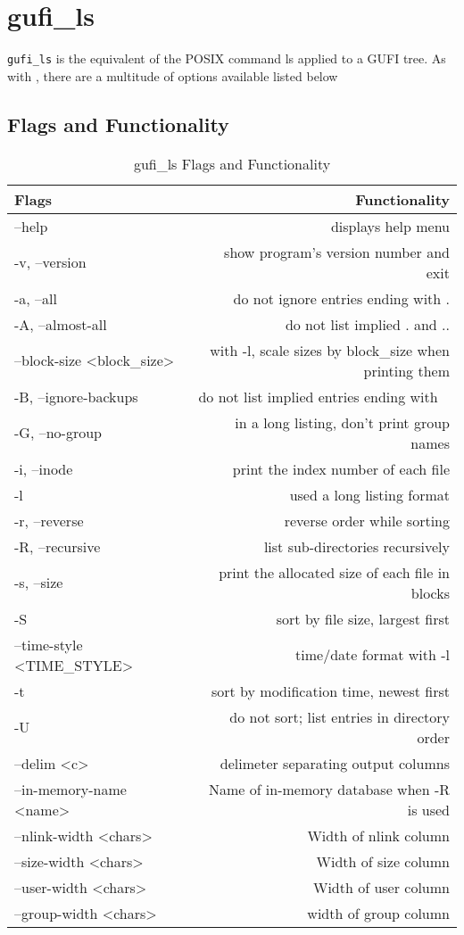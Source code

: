 \section{gufi\_ls}
\texttt{gufi\_ls} is the equivalent of the POSIX command ls applied to
a GUFI tree. As with \gufifind, there are a multitude of options
available listed below

\subsection{Flags and Functionality}
\begin{table} [h]
  \centering
  \begin{tabular}{l|r}
    Flags & Functionality\\\hline
    --help & displays help menu\\
    -v, --version & show program's version number and exit \\
    -a, --all & do not ignore entries ending with .\\
    -A, --almost-all & do not list implied . and .. \\
    --block-size \textless block\_size\textgreater & with -l, scale sizes by block\_size when printing them \\
    -B, --ignore-backups & do not list implied entries ending with ~\\
    -G, --no-group & in a long listing, don't print group names\\
    -i, --inode & print the index number of each file\\
    -l & used a long listing format\\
    -r, --reverse & reverse order while sorting\\
    -R, --recursive & list sub-directories recursively\\
    -s, --size & print the allocated size of each file in blocks\\
    -S & sort by file size, largest first \\
    --time-style \textless TIME\_STYLE\textgreater & time/date format with -l\\
    -t & sort by modification time, newest first\\
    -U & do not sort; list entries in directory order\\
    --delim \textless c\textgreater & delimeter separating output columns\\
    --in-memory-name \textless name\textgreater & Name of in-memory database when -R is used\\
    --nlink-width \textless chars\textgreater & Width of nlink column\\
    --size-width \textless chars\textgreater & Width of size column\\
    --user-width \textless chars\textgreater & Width of user column\\
    --group-width \textless chars\textgreater & width of group column
  \end{tabular}
  \caption{\label{fig:gufi_ls flags}{gufi\_ls Flags and Functionality}}
\end{table}
